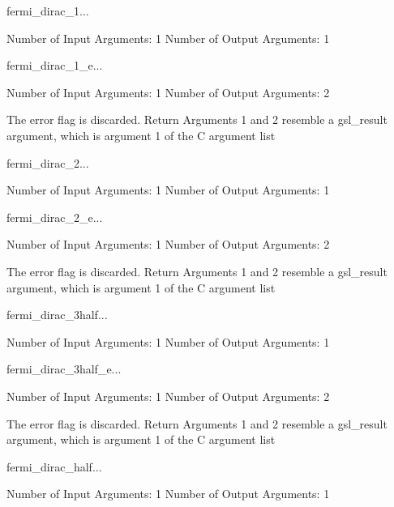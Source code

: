\begin{funcdesc}{fermi_dirac_1}{...}

    Number of Input  Arguments:  1
    Number of Output Arguments:  1
\end{funcdesc}

\begin{funcdesc}{fermi_dirac_1_e}{...}

    Number of Input  Arguments:  1
    Number of Output Arguments:  2

The error flag is discarded.
Return Arguments 1 and 2 resemble a gsl_result argument,
	which is  argument 1 of the C argument list

\end{funcdesc}

\begin{funcdesc}{fermi_dirac_2}{...}

    Number of Input  Arguments:  1
    Number of Output Arguments:  1
\end{funcdesc}

\begin{funcdesc}{fermi_dirac_2_e}{...}

    Number of Input  Arguments:  1
    Number of Output Arguments:  2

The error flag is discarded.
Return Arguments 1 and 2 resemble a gsl_result argument,
	which is  argument 1 of the C argument list

\end{funcdesc}

\begin{funcdesc}{fermi_dirac_3half}{...}

    Number of Input  Arguments:  1
    Number of Output Arguments:  1
\end{funcdesc}

\begin{funcdesc}{fermi_dirac_3half_e}{...}

    Number of Input  Arguments:  1
    Number of Output Arguments:  2

The error flag is discarded.
Return Arguments 1 and 2 resemble a gsl_result argument,
	which is  argument 1 of the C argument list

\end{funcdesc}

\begin{funcdesc}{fermi_dirac_half}{...}

    Number of Input  Arguments:  1
    Number of Output Arguments:  1
\end{funcdesc}

